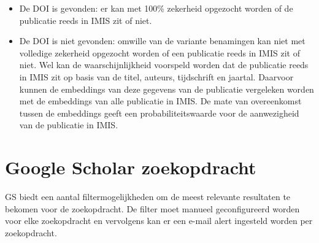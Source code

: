 \begin{itemize}
    \item De DOI is gevonden: er kan met 100\% zekerheid opgezocht worden of de publicatie reeds in IMIS zit of niet.
    \item De DOI is niet gevonden: omwille van de variante benamingen kan niet met volledige zekerheid opgezocht worden of een publicatie reeds in IMIS zit of niet. Wel kan de waarschijnlijkheid voorspeld worden dat de publicatie reeds in IMIS zit op basis van de titel, auteurs, tijdschrift en jaartal. Daarvoor kunnen de embeddings van deze gegevens van de publicatie vergeleken worden met de embeddings van alle publicatie in IMIS. De mate van overeenkomst tussen de embeddings geeft een probabiliteitswaarde voor de aanwezigheid van de publicatie in IMIS.
\end{itemize}
\section{Google Scholar zoekopdracht}
GS biedt een aantal filtermogelijkheden om de meest relevante resultaten te bekomen voor de zoekopdracht. De filter moet manueel geconfigureerd worden voor elke zoekopdracht en vervolgens kan er een e-mail alert ingesteld worden per zoekopdracht.
